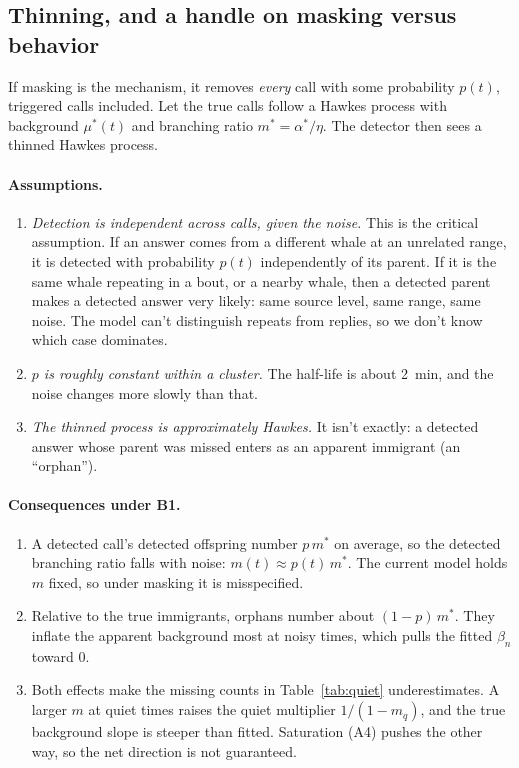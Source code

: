 \documentclass[11pt]{article}
\begin{document}
\subsection{Thinning, and a handle on masking versus behavior}\label{sec:thin}

If masking is the mechanism, it removes \emph{every} call with some
probability $p(t)$, triggered calls included. Let the true calls follow a
Hawkes process with background $\mu^\ast(t)$ and branching ratio
$m^\ast=\alpha^\ast/\eta$. The detector then sees a thinned Hawkes process.

\paragraph{Assumptions.}
\begin{enumerate}[label=B\arabic*.,leftmargin=2.2em]
\item \emph{Detection is independent across calls, given the noise.} This is
  the critical assumption. If an answer comes from a different whale at an
  unrelated range, it is detected with probability $p(t)$ independently of its
  parent. If it is the same whale repeating in a bout, or a nearby whale, then
  a detected parent makes a detected answer very likely: same source level,
  same range, same noise. The model can't distinguish repeats from replies, so
  we don't know which case dominates.
\item \emph{$p$ is roughly constant within a cluster.} The half-life is about
  2~min, and the noise changes more slowly than that.
\item \emph{The thinned process is approximately Hawkes.} It isn't exactly: a
  detected answer whose parent was missed enters as an apparent immigrant (an
  ``orphan'').
\end{enumerate}

\paragraph{Consequences under B1.}
\begin{enumerate}[label=(\alph*)]
\item A detected call's detected offspring number $p\,m^\ast$ on average, so
  the detected branching ratio falls with noise: $m(t)\approx p(t)\,m^\ast$.
  The current model holds $m$ fixed, so under masking it is misspecified.
\item Relative to the true immigrants, orphans number about $(1-p)\,m^\ast$.
  They inflate the apparent background most at noisy times, which pulls the
  fitted $\beta_n$ toward 0.
\item Both effects make the missing counts in Table~\ref{tab:quiet}
  underestimates. A larger $m$ at quiet times raises the quiet multiplier
  $1/(1-m_q)$, and the true background slope is steeper than fitted.
  Saturation (A4) pushes the other way, so the net direction is not
  guaranteed.
\end{enumerate}
\end{document}
